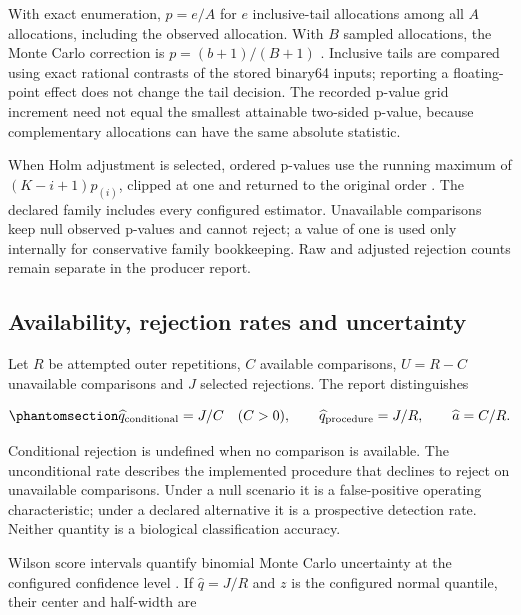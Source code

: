 \documentclass[
  english,
  11pt,
]{article}
\begin{document}
With exact enumeration, \(p=e/A\) for \(e\) inclusive-tail allocations
among all \(A\) allocations, including the observed allocation. With
\(B\) sampled allocations, the Monte Carlo correction is
\(p=(b+1)/(B+1)\) \citep{phipson2010permutation}. Inclusive tails are
compared using exact rational contrasts of the stored binary64 inputs;
reporting a floating-point effect does not change the tail decision. The
recorded p-value grid increment need not equal the smallest attainable
two-sided p-value, because complementary allocations can have the same
absolute statistic.

When Holm adjustment is selected, ordered p-values use the running
maximum of \((K-i+1)p_{(i)}\), clipped at one and returned to the
original order \citep{holm1979}. The declared family includes every
configured estimator. Unavailable comparisons keep null observed
p-values and cannot reject; a value of one is used only internally for
conservative family bookkeeping. Raw and adjusted rejection counts
remain separate in the producer report.

\subsection{Availability, rejection rates and
uncertainty}\label{availability-rejection-rates-and-uncertainty}

Let \(R\) be attempted outer repetitions, \(C\) available comparisons,
\(U=R-C\) unavailable comparisons and \(J\) selected rejections. The
report distinguishes

\begin{equation}\protect\phantomsection\label{eq:power-denominators}{
\widehat q_{\mathrm{conditional}}=J/C\quad(C>0),\qquad
\widehat q_{\mathrm{procedure}}=J/R,\qquad
\widehat a=C/R.
}\end{equation}

Conditional rejection is undefined when no comparison is available. The
unconditional rate describes the implemented procedure that declines to
reject on unavailable comparisons. Under a null scenario it is a
false-positive operating characteristic; under a declared alternative it
is a prospective detection rate. Neither quantity is a biological
classification accuracy.

Wilson score intervals quantify binomial Monte Carlo uncertainty at the
configured confidence level \citep{brown2001interval}. If
\(\widehat q=J/R\) and \(z\) is the configured normal quantile, their
center and half-width are
\end{document}
